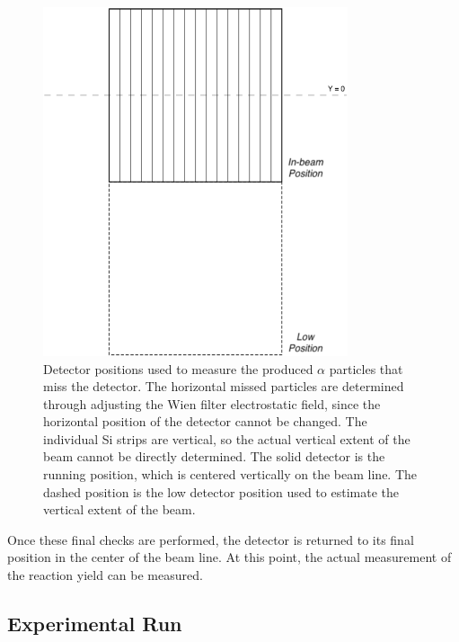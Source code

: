 \begin{figure}[h]
    \begin{center}
        \centerline{\includegraphics[width=0.8\textwidth]{figures/detector_position.png}}
        \caption[Detector positions]{Detector positions used to measure
            the produced $\alpha$ particles that miss the detector. The
            horizontal missed particles are determined through adjusting
            the Wien filter electrostatic field, since the horizontal
            position of the detector cannot be changed. The individual
            Si strips are vertical, so the actual vertical extent of the
            beam cannot be directly determined. The solid detector is
            the running position, which is centered vertically on the
            beam line. The dashed position is the low detector position
            used to estimate the vertical extent of the beam.}
        \label{fig:det-position}
    \end{center}
\end{figure}

Once these final checks are performed, the detector is returned to its
final position in the center of the beam line. At this point, the actual
measurement of the reaction yield can be measured.

\subsection{Experimental Run}

